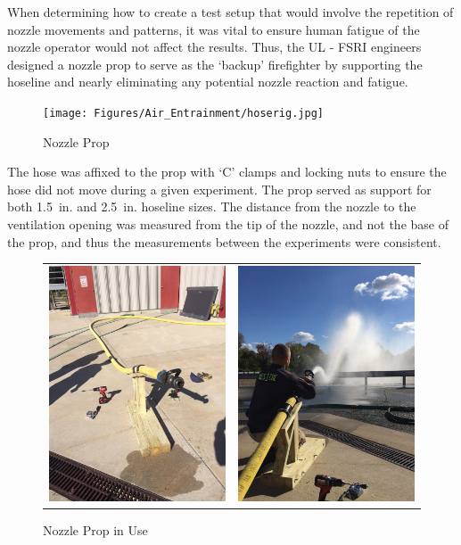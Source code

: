 \documentclass{article}
\begin{document}
When determining how to create a test setup that would involve the repetition of nozzle movements and patterns, it was vital to ensure human fatigue of the nozzle operator would not affect the results. Thus, the UL - FSRI engineers designed a nozzle prop to serve as the `backup' firefighter by supporting the hoseline and nearly eliminating any potential nozzle reaction and fatigue. 

\begin{figure}[!ht]
	\centering
	\texttt{[image: Figures/Air\_Entrainment/hoserig.jpg]}
	\caption{Nozzle Prop}
	\label{fig:Nozzle_Prop}
\end{figure}

\clearpage

The hose was affixed to the prop with `C' clamps and locking nuts to ensure the hose did not move during a given experiment. The prop served as support for both 1.5~in. and 2.5~in. hoseline sizes. The distance from the nozzle to the ventilation opening was measured from the tip of the nozzle, and not the base of the prop, and thus the measurements between the experiments were consistent.

\begin{figure}[ht]
\centering
\begin{tabular*}{\textwidth}{lr}
\includegraphics[width=2.5in]{Figures/Air_Entrainment/Old_Gib.jpg} &
\includegraphics[width=2.5in]{Figures/Air_Entrainment/Old_Gib_1.jpg} \\
\end{tabular*}
\caption{Nozzle Prop in Use}
\label{fig:Nozzle_Prop_in_Use}
\end{figure}
\end{document}
